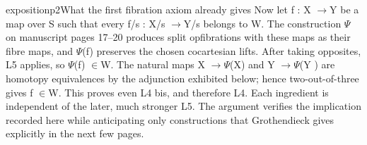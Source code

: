 \begin{dcomment}{exposition}{p2}{What the first fibration axiom already gives}
Now let f : X \ensuremath{\to}Y be a map over S such that every f/s : X/s \ensuremath{\to}Y/s belongs to W. The construction \ensuremath{\Psi} on manuscript pages 17--20 produces split opfibrations with these maps as their fibre maps, and \ensuremath{\Psi}(f) preserves the chosen cocartesian lifts. After taking opposites, L5 applies, so \ensuremath{\Psi}(f) \ensuremath{\in}W. The natural maps X \ensuremath{\to}\ensuremath{\Psi}(X) and Y \ensuremath{\to}\ensuremath{\Psi}(Y ) are homotopy equivalences by the adjunction exhibited below; hence two-out-of-three gives f \ensuremath{\in}W. This proves even L4 bis, and therefore L4. Each ingredient is independent of the later, much stronger L5. The argument verifies the implication recorded here while anticipating only constructions that Grothendieck gives explicitly in the next few pages.

\end{dcomment}

